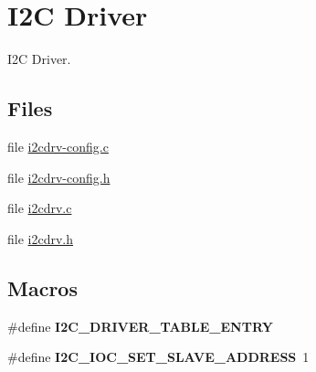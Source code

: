 \hypertarget{group__RTEMSBSPsARMCycVI2C}{}\section{I2C Driver}
\label{group__RTEMSBSPsARMCycVI2C}


I2C Driver.  


\subsection*{Files}
\begin{DoxyCompactItemize}
\item 
file \mbox{\hyperlink{i2cdrv-config_8c}{i2cdrv-\/config.\+c}}
\item 
file \mbox{\hyperlink{i2cdrv-config_8h}{i2cdrv-\/config.\+h}}
\item 
file \mbox{\hyperlink{arm_2altera-cyclone-v_2i2c_2i2cdrv_8c}{i2cdrv.\+c}}
\item 
file \mbox{\hyperlink{arm_2altera-cyclone-v_2include_2bsp_2i2cdrv_8h}{i2cdrv.\+h}}
\end{DoxyCompactItemize}
\subsection*{Macros}
\begin{DoxyCompactItemize}
\item 
\#define {\bfseries I2\+C\+\_\+\+D\+R\+I\+V\+E\+R\+\_\+\+T\+A\+B\+L\+E\+\_\+\+E\+N\+T\+RY}
\item 
\mbox{\label{group__RTEMSBSPsARMCycVI2C_gab5825fdcc8c2acc75db08e44af14dfa8}} 
\#define {\bfseries I2\+C\+\_\+\+I\+O\+C\+\_\+\+S\+E\+T\+\_\+\+S\+L\+A\+V\+E\+\_\+\+A\+D\+D\+R\+E\+SS}~1
\end{DoxyCompactItemize}
